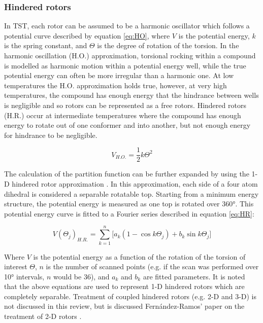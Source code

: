 \documentclass[preprint, 11pt]{elsarticle} %
\begin{document}
\subsubsection{Hindered rotors}

In TST, each rotor can be assumed to be a harmonic oscillator which follows a potential curve described by equation \ref{eq:HO}, where $V$ is the potential energy, $k$ is the spring constant, and $\Theta$ is the degree of rotation of the torsion.
In the harmonic oscillation (H.O.) approximation, torsional rocking within a compound is modelled as harmonic motion within a potential energy well, while the true potential energy can often be more irregular than a harmonic one. 
At low temperatures the H.O. approximation holds true, however, at very high temperatures, the compound has enough energy that the hindrance between wells is negligible and so rotors can be represented as a free rotors. 
Hindered rotors (H.R.) occur at intermediate temperatures where the compound has enough energy to rotate out of one conformer and into another, but not enough energy for hindrance to be negligible.


\begin{equation}
    V_{H.O.} = \frac{1}{2} k \Theta^2
    \label{eq:HO}
\end{equation}

The calculation of the partition function can be further expanded by using the 1-D hindered rotor approximation \cite{pfaendtner:2007}.
In this approximation, each side of a four atom dihedral is considered a separable rotatable top.
Starting from a minimum energy structure, the potential energy is measured as one top is rotated over \ang{360}. 
This potential energy curve is fitted to a Fourier series described in equation \ref{eq:HR}:

\begin{equation}
    V(\Theta_j)_{H.R.} = \sum^{n}_{k=1} \Big[ a_k (1 - \cos{k \Theta_j}) + b_k \sin{k \Theta_j} \Big]
    \label{eq:HR}
\end{equation}

Where $V$ is the potential energy as a function of the rotation of the torsion of interest $\Theta$, $n$ is the number of scanned points (e.g. if the scan was performed over \ang{10} intervals, $n$ would be 36), and $a_k$ and $b_k$ are fitted parameters.
It is noted that the above equations are used to represent 1-D hindered rotors which are completely separable.
Treatment of coupled hindered rotors (e.g. 2-D and 3-D) is not discussed in this review, but is discussed Fernández-Ramos' paper on the treatment of 2-D rotors \cite{fernandez:2013}.
\end{document}
